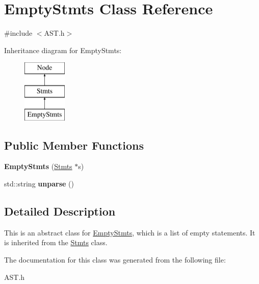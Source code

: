 \hypertarget{class_empty_stmts}{}\section{Empty\+Stmts Class Reference}
\label{class_empty_stmts}


{\ttfamily \#include $<$A\+S\+T.\+h$>$}

Inheritance diagram for Empty\+Stmts\+:\begin{figure}[H]
\begin{center}
\leavevmode
\includegraphics[height=3.000000cm]{class_empty_stmts}
\end{center}
\end{figure}
\subsection*{Public Member Functions}
\begin{DoxyCompactItemize}
\item 
\hypertarget{class_empty_stmts_a46021385e21a38ea41b0ffe571a6fc0b}{}{\bfseries Empty\+Stmts} (\hyperlink{class_stmts}{Stmts} $\ast$s)\label{class_empty_stmts_a46021385e21a38ea41b0ffe571a6fc0b}

\item 
\hypertarget{class_empty_stmts_a737614810093c796094b54d5d9248483}{}std\+::string {\bfseries unparse} ()\label{class_empty_stmts_a737614810093c796094b54d5d9248483}

\end{DoxyCompactItemize}


\subsection{Detailed Description}
This is an abstract class for \hyperlink{class_empty_stmts}{Empty\+Stmts}, which is a list of empty statements. It is inherited from the \hyperlink{class_stmts}{Stmts} class. 

The documentation for this class was generated from the following file\+:\begin{DoxyCompactItemize}
\item 
A\+S\+T.\+h\end{DoxyCompactItemize}
